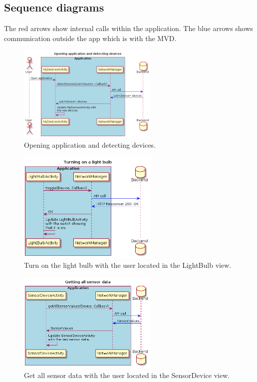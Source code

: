 \documentclass[a4paper]{article}
\begin{document}
	
	\subsection{Sequence diagrams}
	The red arrows show internal calls within the application. The blue arrows shows communication outside the app which is with the MVD.
	
	\begin{figure}[H]
    \centering
    \includegraphics[width=0.6\textwidth]{seq.png}
    \caption{Opening application and detecting devices.}
    \label{fig:seq}
\end{figure}

\begin{figure}[H]
    \centering
    \includegraphics[width=0.6\textwidth]{seq1.png}
    \caption{Turn on the light bulb with the user located in the LightBulb view.}
    \label{fig:seq1}
\end{figure}

\begin{figure}[H]
    \centering
    \includegraphics[width=0.6\textwidth]{seq2.png}
    \caption{Get all sensor data with the user located in the SensorDevice view.}
    \label{fig:seq2}
\end{figure}
\end{document}
